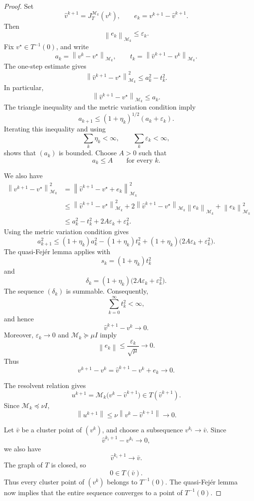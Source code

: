 \documentclass[a4paper,11pt]{book}
\theoremstyle{plain}
\theoremstyle{definition}
\theoremstyle{remark}
\numberwithin{equation}{chapter}
\numberwithin{algorithm}{chapter}
\newcommand{\norm}[1]{\left\|#1\right\|}
\begin{document}
	\begin{proof}
		Set
		\[
		\widehat v^{k+1}=J_T^{\mathcal M_k}(v^k),
		\qquad
		e_k=v^{k+1}-\widehat v^{k+1}.
		\]
		Then
		\[
		\norm{e_k}_{\mathcal M_k}\leq\varepsilon_k.
		\]
		Fix \(v^\star\in T^{-1}(0)\), and write
		\[
		a_k=\norm{v^k-v^\star}_{\mathcal M_k},
		\qquad
		t_k=\norm{\widehat v^{k+1}-v^k}_{\mathcal M_k}.
		\]
		The one-step estimate gives
		\[
		\norm{\widehat v^{k+1}-v^\star}_{\mathcal M_k}^2
		\leq
		a_k^2-t_k^2.
		\]
		In particular,
		\[
		\norm{\widehat v^{k+1}-v^\star}_{\mathcal M_k}
		\leq a_k.
		\]
		The triangle inequality and the metric variation condition imply
		\[
		a_{k+1}
		\leq
		(1+\eta_k)^{1/2}(a_k+\varepsilon_k).
		\]
		Iterating this inequality and using
		\[
		\sum_k\eta_k<\infty,
		\qquad
		\sum_k\varepsilon_k<\infty,
		\]
		shows that \((a_k)\) is bounded. Choose \(A>0\) such that
		\[
		a_k\leq A
		\qquad
		\text{for every }k.
		\]
		
		We also have
		\begin{align}
			\norm{v^{k+1}-v^\star}_{\mathcal M_k}^2
			&=
			\norm{\widehat v^{k+1}-v^\star+e_k}_{\mathcal M_k}^2\\
			&\leq
			\norm{\widehat v^{k+1}-v^\star}_{\mathcal M_k}^2
			+
			2\norm{\widehat v^{k+1}-v^\star}_{\mathcal M_k}
			\norm{e_k}_{\mathcal M_k}
			+
			\norm{e_k}_{\mathcal M_k}^2\\
			&\leq
			a_k^2-t_k^2+2A\varepsilon_k+\varepsilon_k^2.
		\end{align}
		Using the metric variation condition gives
		\[
		a_{k+1}^2
		\leq
		(1+\eta_k)a_k^2
		-
		(1+\eta_k)t_k^2
		+
		(1+\eta_k)
		\bigl(2A\varepsilon_k+\varepsilon_k^2\bigr).
		\]
		The quasi-Fejér lemma applies with
		\[
		s_k=(1+\eta_k)t_k^2
		\]
		and
		\[
		\delta_k
		=
		(1+\eta_k)
		\bigl(2A\varepsilon_k+\varepsilon_k^2\bigr).
		\]
		The sequence \((\delta_k)\) is summable. Consequently,
		\[
		\sum_{k=0}^{\infty}t_k^2<\infty,
		\]
		and hence
		\[
		\widehat v^{k+1}-v^k\longrightarrow0.
		\]
		Moreover, \(\varepsilon_k\to0\) and
		\(\mathcal M_k\succeq\mu I\) imply
		\[
		\norm{e_k}
		\leq
		\frac{\varepsilon_k}{\sqrt{\mu}}
		\longrightarrow0.
		\]
		Thus
		\[
		v^{k+1}-v^k
		=
		\widehat v^{k+1}-v^k+e_k
		\longrightarrow0.
		\]
		
		The resolvent relation gives
		\[
		u^{k+1}
		=
		\mathcal M_k
		\bigl(v^k-\widehat v^{k+1}\bigr)
		\in T(\widehat v^{k+1}).
		\]
		Since \(\mathcal M_k\preceq\nu I\),
		\[
		\norm{u^{k+1}}
		\leq
		\nu\norm{v^k-\widehat v^{k+1}}
		\longrightarrow0.
		\]
		
		Let \(\bar v\) be a cluster point of \((v^k)\), and choose a subsequence
		\(v^{k_i}\to\bar v\). Since
		\[
		\widehat v^{k_i+1}-v^{k_i}\longrightarrow0,
		\]
		we also have
		\[
		\widehat v^{k_i+1}\longrightarrow\bar v.
		\]
		The graph of \(T\) is closed, so
		\[
		0\in T(\bar v).
		\]
		Thus every cluster point of \((v^k)\) belongs to \(T^{-1}(0)\). The
		quasi-Fejér lemma now implies that the entire sequence converges to a point
		of \(T^{-1}(0)\).
	\end{proof}
	
\end{document}
